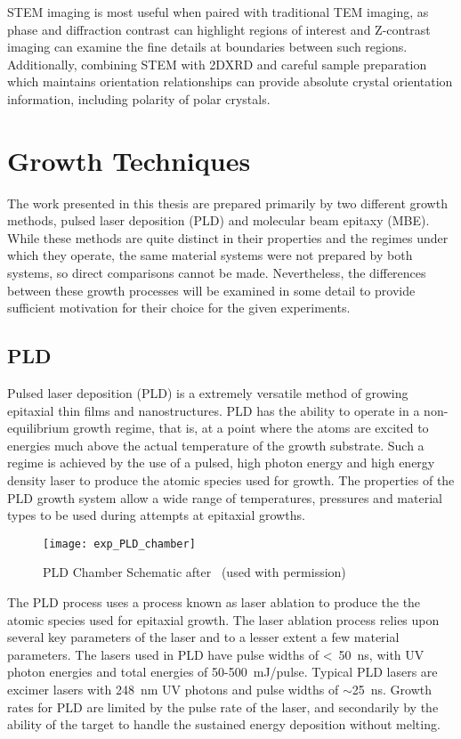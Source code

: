 STEM imaging is most useful when paired with traditional TEM imaging, as phase and diffraction contrast can highlight regions of interest and Z-contrast imaging can examine the fine details at boundaries between such regions.
Additionally, combining STEM with 2DXRD and careful sample preparation which maintains orientation relationships can provide absolute crystal orientation information, including polarity of polar crystals.

\section{Growth Techniques}
The work presented in this thesis are prepared primarily by two different growth methods, pulsed laser deposition (PLD) and molecular beam epitaxy (MBE).
While these methods are quite distinct in their properties and the regimes under which they operate, the same material systems were not prepared by both systems, so direct comparisons cannot be made.
Nevertheless, the differences between these growth processes will be examined in some detail to provide sufficient motivation for their choice for the given experiments.
\subsection{PLD} Pulsed laser deposition (PLD) is a extremely versatile method of growing epitaxial thin films and nanostructures.
PLD has the ability to operate in a non-equilibrium growth regime, that is, at a point where the atoms are excited to energies much above the actual temperature of the growth substrate.
Such a regime is achieved by the use of a pulsed, high photon energy and high energy density laser to produce the atomic species used for growth.
The properties of the PLD growth system allow a wide range of temperatures, pressures and material types to be used during attempts at epitaxial growths.
\begin{figure}
 \centering \texttt{[image: exp\_PLD\_chamber]}
 \caption{\label{fig:exp_pld_chamber}PLD Chamber Schematic after~\cite{stephen-thesis} (used with permission)}
\end{figure}

The PLD process uses a process known as laser ablation to produce the the atomic species used for epitaxial growth.
The laser ablation process relies upon several key parameters of the laser and to a lesser extent a few material parameters.
The lasers used in PLD have pulse widths of <~50~ns, with UV photon energies and total energies of 50-500~mJ/pulse.
Typical PLD lasers are excimer lasers with 248~nm UV photons and pulse widths of \(\sim\)25~ns.
Growth rates for PLD are limited by the pulse rate of the laser, and secondarily by the ability of the target to handle the sustained energy deposition without melting.

